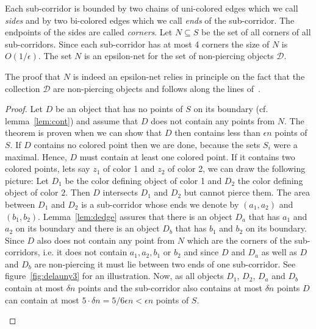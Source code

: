 \documentclass{stacs_proc}
\newcommand{\bigO}{O}
\newcommand{\D}{\mathcal{D}}
\begin{document}
Each sub-corridor is bounded by two chains of uni-colored edges which
we call \emph{sides} and by two bi-colored edges which we call
\emph{ends} of the sub-corridor. The endpoints of the sides are called
\emph{corners}. Let $N\subseteq S$ be the set of all corners of all
sub-corridors. Since each sub-corridor has at most 4 corners the size
of $N$ is $\bigO(1/ \epsilon)$. 
The set $N$ is an epsilon-net for the set of non-piercing objects
$\D$.

The proof that $N$ is indeed an epsilon-net relies in principle on the
fact that the collection $\D$ are non-piercing objects and follows
along the lines of~\cite{MSW90}. 
\begin{proof}
  Let $D$ be an object that has no points of $S$ on its boundary
  (cf. lemma~\ref{lem:cont}) and assume that $D$ does not contain any
  points from $N$. The theorem is proven when we can show that $D$
  then contains less than $\epsilon n$ points of $S$. If $D$ contains no
  colored point then we are done, because the sets $S_i$ were a
  maximal. Hence, $D$ must contain at least one colored point. If it
  contains two colored points, lets say $z_1$ of color 1 and $z_2$ of
  color 2, we can draw the following picture: Let $D_1$ be the color
  defining object of color 1 and $D_2$ the color defining object of
  color $2$. Then $D$ intersects $D_1$ and $D_2$ but cannot pierce
  them. The area between $D_1$ and $D_2$ is a sub-corridor whose ends
  we denote by $(a_1, a_2)$ and $(b_1, b_2)$. Lemma~\ref{lem:dedge}
  assures that there is an object $D_a$ that has $a_1$ and $a_2$ on
  its boundary and there is an object $D_b$ that has $b_1$ and $b_2$
  on its boundary. Since $D$ also does not contain any point from $N$
  which are the corners of the sub-corridors, i.e. it does not contain
  $a_1, a_2, b_1$ or $b_2$ and since $D$ and $D_a$ as well as $D$ and
  $D_b$ are non-piercing it must lie between two ends of one
  sub-corridor. See figure~\ref{fig:delauny3} for an
  illustration. Now, as all objects $D_1$, $D_2$, $D_a$ and $D_b$
  contain at most $\delta n$ points and the sub-corridor also contains at
  most $\delta n$ points $D$ can contain at most $5\cdot \delta n = 5/6 \epsilon n < \epsilon n$
  points of $S$. 
\begin{figure}
\vspace{-2ex}
\begin{minipage}{0.45\textwidth}
  \begin{center}

\end{center}
\end{minipage}
\end{figure}
\end{proof}
\end{document}
